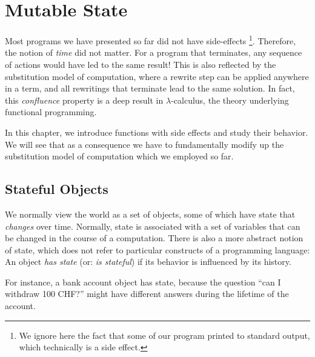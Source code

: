 {\chapter{Mutable State}

Most programs we have presented so far did not have side-effects
\footnote{We ignore here the fact that some of our program printed to
standard output, which technically is a side effect.}.  Therefore, the
notion of {\em time} did not matter.  For a program that terminates,
any sequence of actions would have led to the same result!  This is
also reflected by the substitution model of computation, where a
rewrite step can be applied anywhere in a term, and all rewritings
that terminate lead to the same solution.  In fact, this {\em
confluence} property is a deep result in $\lambda$-calculus, the
theory underlying functional programming. 

In this chapter, we introduce functions with side effects and study
their behavior. We will see that as a consequence we have to
fundamentally modify up the substitution model of computation which we
employed so far.

\section{Stateful Objects}

We normally view the world as a set of objects, some of which have
state that {\em changes} over time.  Normally, state is associated
with a set of variables that can be changed in the course of a
computation.  There is also a more abstract notion of state, which
does not refer to particular constructs of a programming language: An
object {\em has state} (or: {\em is stateful}) if its behavior is
influenced by its history.

For instance, a bank account object has state, because the question
``can I withdraw 100 CHF?''
might have different answers during the lifetime of the account.

}
